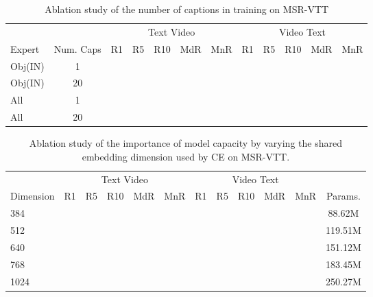 \documentclass{bmvc2k}
\begin{document}
\begin{table}[h!]
\centering 
\footnotesize 
\setlength{\tabcolsep}{1.5pt}
\begin{tabular}{l c| c c c c c| c c c c c}
\hline \hline
\multicolumn{1}{c}{} & \multicolumn{1}{c}{} &
\multicolumn{5}{c}{Text  Video} & \multicolumn{5}{c}{Video  Text} \\
Expert & Num. Caps & R1 & R5 & R10 & MdR & MnR & R1 & R5 & R10 & MdR & MnR \\ 
\hline 
Obj(IN) & 1 &	&	&	&	& &	&	&	&	& \\
Obj(IN) & 20 &	&	&	&	& &	&	&	&	& \\
All & 1 &	&	&	&	& &	&	&	&	& \\
All & 20 &	&	&	&	& &	&	&	&	& \\

\hline \hline

\end{tabular}
\caption{Ablation study of the number of captions in training on MSR-VTT}
\end{table}

\begin{table}[h!]
\centering 
\footnotesize 
\setlength{\tabcolsep}{1.5pt}
\begin{tabular}{l c c c c c| c c c c c | c}
\hline \hline
\multicolumn{1}{c}{} &
\multicolumn{5}{c}{Text  Video} & \multicolumn{5}{c}{Video  Text} & \multicolumn{1}{c}{} \\
Dimension & R1 & R5 & R10 & MdR & MnR & R1 & R5 & R10 & MdR & MnR & Params. \\ 
\hline   
384	&	&	&	&	& &	&	&	&	& & 88.62M\\
512	&	&	&	&	& &	&	&	&	& & 119.51M\\	
640	&	&	&	&	& &	&	&	&	& & 151.12M\\
768	&	&	&	&	& &	&	&	&	& & 183.45M\\	
1024 &	&	&	&	& &	&	&	&	& & 250.27M\\	
\hline \hline

\end{tabular}
\caption{Ablation study of the importance of model capacity by varying the shared embedding dimension used by CE on MSR-VTT.}
\end{table}
\end{document}
